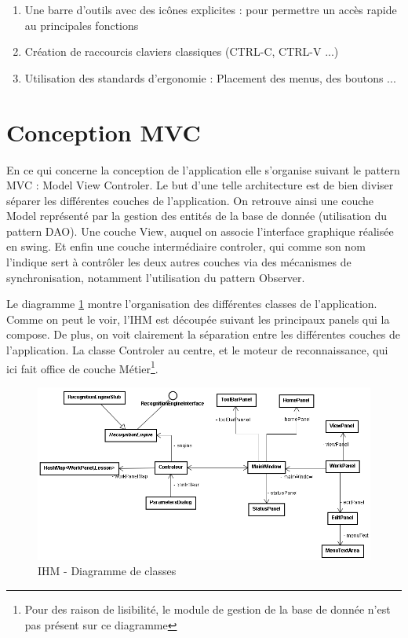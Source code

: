 \begin{enumerate}
 \item Une barre d'outils avec des icônes explicites : pour permettre un accès rapide au principales fonctions
 \item Création de raccourcis claviers classiques (CTRL-C, CTRL-V ...)
 \item Utilisation des standards d'ergonomie : Placement des menus, des boutons ...
\end{enumerate}



\section{Conception MVC}

En ce qui concerne la conception de l'application elle s'organise suivant le pattern MVC : Model View Controler. Le but d'une telle architecture est de bien diviser séparer les différentes couches de l'application. On retrouve ainsi une couche Model représenté par la gestion des entités de la base de donnée (utilisation du pattern DAO). Une couche View, auquel on associe l'interface graphique réalisée en swing. Et enfin une couche intermédiaire controler, qui comme son nom l'indique sert à contrôler les deux autres couches via des mécanismes de synchronisation, notamment l'utilisation du pattern Observer. 

Le diagramme \ref{fig:ihmUMLl} montre l'organisation des différentes classes de l'application. Comme on peut le voir, l'IHM est découpée suivant les principaux panels qui la compose. De plus, on voit clairement la séparation entre les différentes couches de l'application. La classe Controler au centre, et le moteur de reconnaissance, qui ici fait office de couche Métier\footnote{Pour des raison de lisibilité, le module de gestion de la base de donnée n'est pas présent sur ce diagramme}.





\begin{figure}[h]
 \centering
 \includegraphics[scale=0.5]{./images/ihmUML.png}
 \caption{IHM - Diagramme de classes}
 \label{fig:ihmUMLl}
\end{figure}


